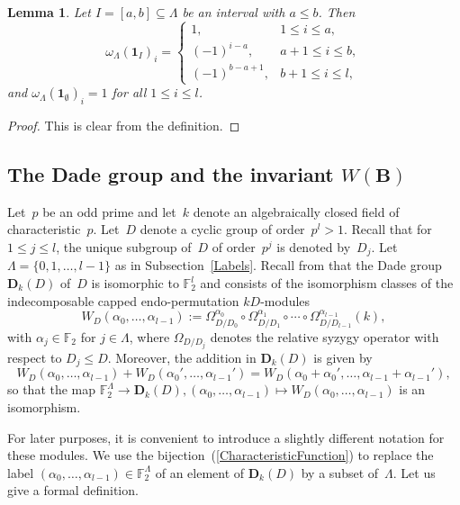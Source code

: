 \documentclass[12pt]{amsart}
\newcommand{\bB}{{\mathbf{B}}}
\newcommand{\dade}{{\mathbf{D}_k}}
\newtheorem{lem}[thm]{Lemma}
\theoremstyle{theorem}
\theoremstyle{definition}
\theoremstyle{remark}
\begin{document}
\begin{lem}
\label{OmegaOfInterval}
Let $I = [a,b] \subseteq \Lambda$ be an interval with $a \leq b$.
Then
$$
\omega_{\Lambda}( \mathbf{1}_I )_i = 
\begin{cases}
1, & 1 \leq i \leq a, \\
(-1)^{i - a}, & a + 1 \leq i \leq b, \\
(-1)^{b - a + 1}, & b + 1 \leq i \leq l,
\end{cases}
$$
and $\omega_{\Lambda}( \mathbf{1}_{\emptyset} )_i = 1$ for all 
$1 \leq i \leq l$.
\end{lem}
\begin{proof}
This is clear from the definition.
\end{proof}

\subsection{The Dade group and the invariant $W( \bB )$}
Let~$p$ be an odd prime and let~$k$ denote an algebraically closed field of
characteristic~$p$. Let~$D$ denote a cyclic group of order~$p^l > 1$. Recall 
that for $1 \leq j \leq l$, the unique subgroup of~$D$ of order~$p^j$ is denoted 
by~$D_j$. Let $\Lambda = \{ 0, 1, \ldots , l - 1 \}$ as in 
Subsection~\ref{Labels}. Recall from \cite[Subsection~$3.1$]{HL24} that the Dade 
group $\dade(D)$ of~$D$ is isomorphic to $\mathbb{F}_2^l$ and consists of the 
isomorphism classes of the indecomposable capped endo-permutation $kD$-modules 
$$W_D( \alpha_0, \ldots , \alpha_{l-1}) := 
\Omega_{D/D_0}^{\alpha_0}\circ\Omega_{D/D_1}^{\alpha_1}\circ\cdots
\circ\Omega_{D/D_{l-1}}^{\alpha_{l-1}}(k),$$ 
with $\alpha_j \in \mathbb{F}_2$ for $j \in \Lambda$, where $\Omega_{D/D_j}$
denotes the relative syzygy operator with respect to $D_j \leq D$. 
Moreover, the addition in $\dade(D)$ is given by
$$W_D( \alpha_0, \ldots , \alpha_{l-1}) + W_D( \alpha_0', \ldots , \alpha_{l-1}') 
= W_D( \alpha_0 + \alpha_0', \ldots , \alpha_{l-1} + \alpha_{l-1}'),$$
so that the map $\mathbb{F}_2^{\Lambda} \rightarrow \dade(D), 
(\alpha_0, \ldots , \alpha_{l-1}) \mapsto W_D( \alpha_0, \ldots , \alpha_{l-1})$ 
is an isomorphism.

For later purposes, it is convenient to introduce a slightly different notation 
for these modules.  We use the bijection~(\ref{CharacteristicFunction}) to 
replace the label $(\alpha_0, \ldots , \alpha_{l-1}) \in \mathbb{F}_2^{\Lambda}$ 
of an element of $\dade(D)$ by a subset of~$\Lambda$. Let us give a formal 
definition.
\end{document}
